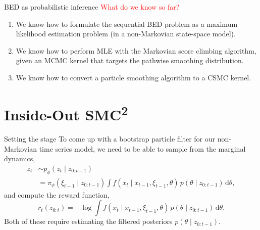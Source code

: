 \documentclass[10pt, aspectratio=1610]{beamer}
\newcommand{\dd}{\mathrm{d}}
\begin{document}
    \begin{frame}{BED as probabilistic inference}
      \textcolor{red}{\large What do we know so far?}\vspace{0.1cm}
      \begin{enumerate}
        \item<2-> We know how to formulate the sequential BED problem as a maximum likelihood estimation problem (in a non-Markovian state-space model).
        \item<3-> We know how to perform MLE with the Markovian score climbing algorithm, given an MCMC kernel that targets the pathwise smoothing distribution.
        \item<4-> We know how to convert a particle smoothing algorithm to a CSMC kernel.
      \end{enumerate}

      \vspace{0.3cm}
    \end{frame}

  \section{Inside-Out \texorpdfstring{SMC\textsuperscript{2}}{SMC2}}
    \begin{frame}{Setting the stage}
      To come up with a bootstrap particle filter for our non-Markovian time series model, we need to be able to sample from the marginal dynamics,
      \begin{align}
        z_t &\sim p_\phi(z_t \mid z_{0:t-1}) \\
        &= \pi_\phi(\xi_{t-1} \mid z_{0:t-1}) \int f(x_t \mid x_{t-1}, \xi_{t-1}, \theta) \, p(\theta \mid z_{0:t-1}) \, \dd \theta,
      \end{align}
      and compute the reward function,
      \begin{equation}
        r_t(z_{0:t}) = - \log \int f(x_t \mid x_{t-1}, \xi_{t-1}, \theta) \, p(\theta \mid z_{0:t-1}) \, \dd \theta.
      \end{equation}
      \pause
      Both of these require estimating the filtered posteriors $p(\theta \mid z_{0:t-1})$.
    \end{frame}
\end{document}
